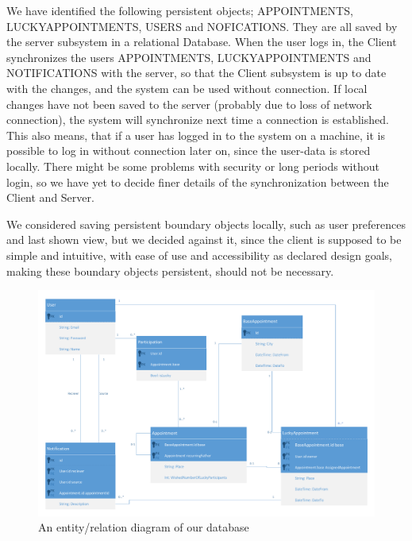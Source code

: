 We have identified the following persistent objects; APPOINTMENTS, LUCKYAPPOINTMENTS, USERS and NOFICATIONS. They are all saved by the server subsystem in a relational Database. When the user logs in, the Client synchronizes the users APPOINTMENTS, LUCKYAPPOINTMENTS and NOTIFICATIONS with the server, so that the Client subsystem is up to date with the changes, and the system can be used without connection. If local changes have not been saved to the server (probably due to loss of network connection), the system will synchronize next time a connection is established. This also means, that if a user has logged in to the system on a machine, it is possible to log in without connection later on, since the user-data is stored locally. There might be some problems with security or long periods without login, so we have yet to decide finer details of the synchronization between the Client and Server.

We considered saving persistent boundary objects locally, such as user preferences and last shown view, but we decided against it, since the client is supposed to be simple and intuitive, with ease of use and accessibility as declared design goals, making these boundary objects persistent, should not be necessary. 

\begin{figure}[ht]
\centering
\includegraphics[scale=.35]{sections/db_mapping.pdf}
\caption{An entity/relation diagram of our database}
\end{figure}
